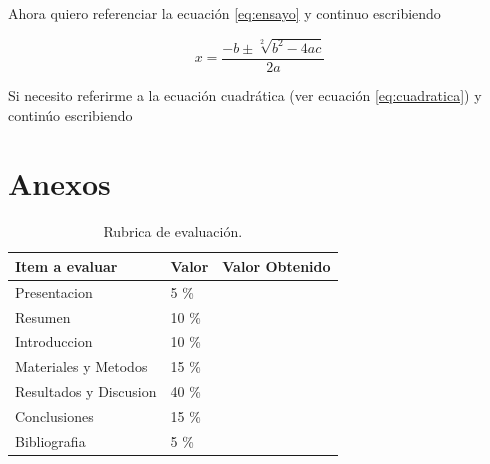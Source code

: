 \documentclass[letterpaper]{article}
\begin{document}
Ahora quiero referenciar la ecuación \ref{eq:ensayo} y continuo escribiendo


\begin{equation}
\label{eq:cuadratica}
x=\frac { -b\pm \sqrt [ 2 ]{ { b }^{ 2 }-4ac }  }{ 2a } 
\end{equation}

Si necesito referirme a la ecuación cuadrática (ver ecuación \ref{eq:cuadratica}) y continúo escribiendo




\newpage
\section{Anexos}




\begin{table}[h!]
	\centering
	\begin{tabu} to 0.9\textwidth {  X[c]  X[c]  X[c]  }
		\hline
		\textbf{Item a evaluar} & \textbf{Valor} & \textbf{Valor Obtenido} \\ \hline
		Presentacion            & 5 \%             &                         \\ \hline
		Resumen                 & 10 \%            &                         \\ \hline
		Introduccion            & 10 \%            &                         \\ \hline
		Materiales y Metodos    & 15 \%            &                         \\ \hline
		Resultados y Discusion  & 40 \%            &                         \\ \hline
		Conclusiones            & 15 \%            &                         \\ \hline
		Bibliografia            & 5 \%             &                         \\ \hline
	\end{tabu}
	\caption{Rubrica de evaluación.}
	\label{Rubros}
\end{table}
\end{document}
